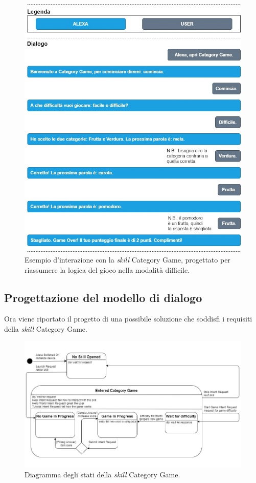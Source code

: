 \begin{figure}[!h]
  \centering
  \includegraphics[scale=0.5]{resources/images/analysis/skill-flow-example/category-game-flow-example-difficult.jpg}
  \caption{
    Esempio d'interazione con la \textit{skill} Category Game, progettato per
    riassumere la logica del gioco nella modalità difficile.
  }
  \label{fig:figure4.4}
\end{figure}
\newpage

\subsection{Progettazione del modello di dialogo}
\label{subsec:Sezione4.2.2}

Ora viene riportato il progetto di una possibile soluzione che soddisfi i
requisiti della \textit{skill} Category Game.

\begin{figure}[!ht]
  \centering
  \includegraphics[scale=0.48]{resources/images/design/skill-state-diagram/category-game-state-diagram.jpg}
  \caption{Diagramma degli stati della \textit{skill} Category Game.}
  \label{fig:figure4.5}
\end{figure}

